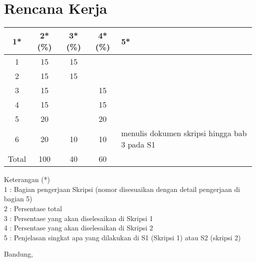 \documentclass[a4paper,twoside]{article}
\begin{document}
\section{Rencana Kerja}
\begin{center}
  \begin{tabular}{ | c | c | c | c | l |}
    \hline
    1*  & 2*(\%) & 3*(\%) & 4*(\%) &5*\\ \hline \hline
    1   & 15  & 15  &  &  \\ \hline
    2   & 15 & 15  &   & \\ \hline
    3   & 15  &   & 15 & \\ \hline
    4   & 15  &   & 15 & \\ \hline
    5   & 20  &   & 20 & \\ \hline
    6   & 20  & 10  & 10 &  {\footnotesize menulis dokumen skripsi hingga bab 3 pada S1}\\ \hline
    Total  & 100  & 40  & 60 &  \\ \hline
                          \end{tabular}
\end{center}

Keterangan (*)\\
1 : Bagian pengerjaan Skripsi (nomor disesuaikan dengan detail pengerjaan di bagian 5)\\
2 : Persentase total \\
3 : Persentase yang akan diselesaikan di Skripsi 1 \\
4 : Persentase yang akan diselesaikan di Skripsi 2 \\
5 : Penjelasan singkat apa yang dilakukan di S1 (Skripsi 1) atau S2 (skripsi 2)

\vspace{1cm}
\centering Bandung, \tanggal\\
\vspace{2cm} \nama \\ 
\vspace{1cm}
\end{document}
